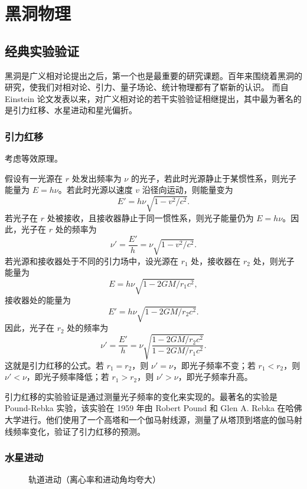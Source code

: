 \chapter{黑洞物理}\label{chpt:BH}

\section{经典实验验证}

黑洞是广义相对论提出之后，第一个也是最重要的研究课题。百年来围绕着黑洞的研究，使我们对相对论、引力、量子场论、统计物理都有了崭新的认识。
而自 Einstein 论文发表以来，对广义相对论的若干实验验证相继提出，其中最为著名的是引力红移、水星进动和星光偏折。

\subsection{引力红移}



考虑等效原理。

假设有一光源在 $r$ 处发出频率为 $\nu$ 的光子，若此时光源静止于某惯性系，则光子能量为 $E=h\nu$。若此时光源以速度 $v$ 沿径向运动，则能量变为
\[E'=h\nu\sqrt{1-v^2/c^2}.\]
若光子在 $r$ 处被接收，且接收器静止于同一惯性系，则光子能量仍为 $E=h\nu$。因此，光子在 $r$ 处的频率为
\[\nu'=\frac{E'}{h}= \nu\sqrt{1-v^2/c^2}.\]
若光源和接收器处于不同的引力场中，设光源在 $r_1$ 处，接收器在 $r_2$ 处，则光子能量为
\[E=h\nu\sqrt{1-2GM/r_1c^2},\]
接收器处的能量为
\[E'=h\nu\sqrt{1-2GM/r_2c^2}.\]
因此，光子在 $r_2$ 处的频率为
\[\nu'=\frac{E'}{h}= \nu\sqrt{\frac{1-2GM/r_2c^2}{1-2GM/r_1c^2}}.\]
这就是引力红移的公式。若 $r_1=r_2$，则 $\nu'=\nu$，即光子频率不变；若 $r_1<r_2$，则 $\nu'<\nu$，即光子频率降低；若 $r_1>r_2$，则 $\nu'>\nu$，即光子频率升高。

引力红移的实验验证是通过测量光子频率的变化来实现的。最著名的实验是 Pound-Rebka 实验，该实验在 1959 年由 Robert Pound 和 Glen A. Rebka 在哈佛大学进行。他们使用了一个高塔和一个伽马射线源，测量了从塔顶到塔底的伽马射线频率变化，验证了引力红移的预测。

\subsection{水星进动}

\begin{figure}\centering
    \caption{\small 轨道进动（离心率和进动角均夸大）}
\end{figure}

